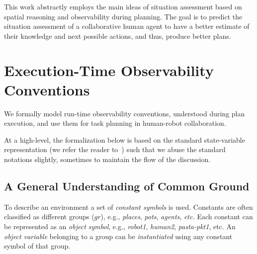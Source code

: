 \documentclass[letterpaper]{article} %
\begin{document}

This work abstractly employs the main ideas of situation assessment based on spatial reasoning and observability during planning. The goal is to predict the situation assessment of a collaborative human agent to have a better estimate of their knowledge and next possible actions, and thus, produce better plans.













\section{Execution-Time Observability Conventions}
We formally model run-time observability conventions, understood during plan execution, and use them for task planning in human-robot collaboration. 

At a high-level, the formalization below is based on the standard state-variable representation (we refer the reader to~\cite{naubooks0014222}) such that we abuse the standard notations slightly, sometimes to maintain the flow of the discussion.

\subsection{A General Understanding of Common Ground}
To describe an environment a set of \textit{constant symbols} is used. 
Constants are often classified as different groups ($gr$), e.g., \textit{places}, \textit{pots}, \textit{agents}, \textit{etc.} 
Each constant can be represented as an \textit{object symbol}, e.g., \textit{robot1}, \textit{human2}, \textit{pasta-pkt1}, etc. 
An \textit{object variable} belonging to a group can be \textit{instantiated} using any constant symbol of that group.
\end{document}
